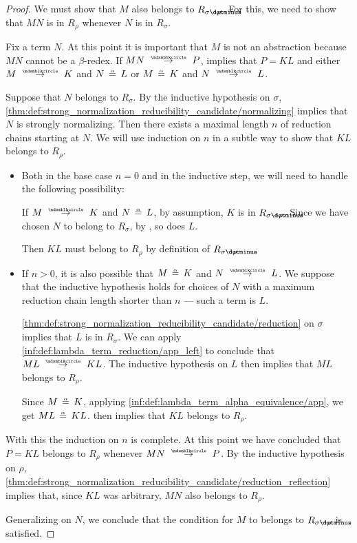 \begin{proof}
  We must show that \( M \) also belongs to \( R_{\sigma \synimplies \rho} \). For this, we need to show that \( MN \) is in \( R_\rho \) whenever \( N \) is in \( R_\sigma \).

  Fix a term \( N \). At this point it is important that \( M \) is not an abstraction because \( MN \) cannot be a \( \beta \)-redex. If \( MN \pred P \),  implies that \( P = KL \) and either \( M \pred K \) and \( N \aequiv L \) or \( M \aequiv K \) and \( N \pred L \).

  Suppose that \( N \) belongs to \( R_\sigma \). By the inductive hypothesis on \( \sigma \), \ref{thm:def:strong_normalization_reducibility_candidate/normalizing} implies that \( N \) is strongly normalizing. Then there exists a maximal length \( n \) of reduction chains starting at \( N \). We will use induction on \( n \) in a subtle way to show that \( KL \) belongs to \( R_\rho \).

  \begin{itemize}
    \item Both in the base case \( n = 0 \) and in the inductive step, we will need to handle the following possibility:

    If \( M \pred K \) and \( N \aequiv L \), by assumption, \( K \) is in \( R_{\sigma \synimplies \rho} \). Since we have chosen \( N \) to belong to \( R_\sigma \), by , so does \( L \).

    Then \( KL \) must belong to \( R_\rho \) by definition of \( R_{\sigma \synimplies \rho} \).

    \item If \( n > 0 \), it is also possible that \( M \aequiv K \) and \( N \pred L \). We suppose that the inductive hypothesis holds for choices of \( N \) with a maximum reduction chain length shorter than \( n \) --- such a term is \( L \).

    \ref{thm:def:strong_normalization_reducibility_candidate/reduction} on \( \sigma \) implies that \( L \) is in \( R_\sigma \). We can apply \ref{inf:def:lambda_term_reduction/app_left} to conclude that \( ML \pred KL \). The inductive hypothesis on \( L \) then implies that \( ML \) belongs to \( R_\rho \).

    Since \( M \aequiv K \), applying \ref{inf:def:lambda_term_alpha_equivalence/app}, we get \( ML \aequiv KL \).  then implies that \( KL \) belongs to \( R_\rho \).
  \end{itemize}

  With this the induction on \( n \) is complete. At this point we have concluded that \( P = KL \) belongs to \( R_\rho \) whenever \( MN \pred P \). By the inductive hypothesis on \( \rho \), \ref{thm:def:strong_normalization_reducibility_candidate/reduction_reflection} implies that, since \( KL \) was arbitrary, \( MN \) also belongs to \( R_\rho \).

  Generalizing on \( N \), we conclude that the condition for \( M \) to belongs to \( R_{\sigma \synimplies \rho} \) is satisfied.
\end{proof}

